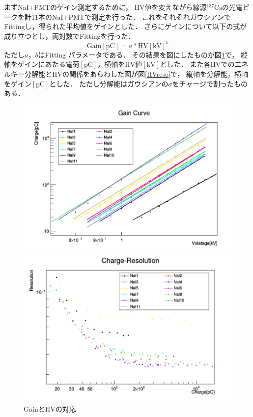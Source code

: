 まずNaI+PMTのゲイン測定するために，
HV値を変えながら線源$^{137}\mathrm{Cs}$の光電ピークを計11本のNaI+PMTで測定を行った．
これをそれぞれガウシアンでFittingし，得られた平均値をゲインとした．
さらにゲインについて以下の式が成り立つとし，両対数でFittingを行った．
\begin{equation}
\mathrm{Gain}[\mathrm{pC}]=a*\mathrm{HV}[\mathrm{kV}]^b  
\end{equation}
ただし$a， b$はFitting パラメータである．
その結果を図にしたものが図\ref{GainHV}で，
縦軸をゲインにあたる電荷$[\mathrm{pC}]$，横軸をHV値$[\mathrm{kV}]$とした．
また各HVでのエネルギー分解能とHVの関係をあらわした図が図\ref{HVreso}で，
縦軸を分解能，横軸をゲイン$[\mathrm{pC}]$とした．
ただし分解能はガウシアンの$\sigma$をチャージで割ったものある．
\begin{figure}[H]
  \begin{minipage}{0.45\hsize}
    \begin{center}\hspace*{-1em}
      \includegraphics[width=1.1\textwidth]{figure/tajima/gain_curve.png}
    \end{center}
    \caption{GainとHVの対応}
    \label{GainHV}
  \end{minipage}
  \hfill
  \begin{minipage}{0.45\hsize}
    \begin{center}
      \includegraphics[width=1.1\textwidth]{figure/tajima/charge_resolution.png}

\end{center}
\end{minipage}
\end{figure}
